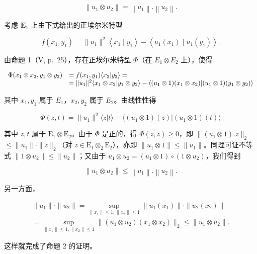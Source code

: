 \[
\left\| u _ {1} \otimes u _ {2} \right\| = \left\| u _ {1} \right\|. \left\| u _ {2} \right\|.
\]

考虑 \(\mathbf{E}_1\) 上由下式给出的正埃尔米特型

\[
f \left(x _ {1}, y _ {1}\right) = \| u _ {1} \| ^ {2} \left\langle x _ {1} \mid y _ {1} \right\rangle - \left\langle u _ {1} \left(x _ {1}\right) \mid u _ {1} \left(y _ {1}\right) \right\rangle .
\]

由命题 1（V, p.~25），存在正埃尔米特型 \(\Phi\)（在 \(E_1 \otimes E_2\) 上），使得

\[
\begin{array}{r l} \Phi (x _ {1} \otimes x _ {2}, y _ {1} \otimes y _ {2}) & = f (x _ {1}, y _ {1}) \langle x _ {2} | y _ {2} \rangle = \\ & = \| u _ {1} \| ^ {2} \langle x _ {1} \otimes x _ {2} | y _ {1} \otimes y _ {2} \rangle - \langle (u _ {1} \otimes 1) (x _ {1} \otimes x _ {2}) | (u _ {1} \otimes 1) (y _ {1} \otimes y _ {2}) \rangle \end{array}
\]

其中 \(x_{1}, y_{1}\) 属于 \(E_{1}\)，\(x_{2}, y_{2}\) 属于 \(E_{2}\)。由线性性得

\[
\Phi (z, t) = \| u _ {1} \| ^ {2} \langle z | t \rangle - \langle (u _ {1} \otimes 1) (z) | (u _ {1} \otimes 1) (t) \rangle
\]

其中 \(z, t\) 属于 \(\mathrm{E}_1 \otimes \mathrm{E}_2\)。由于 \(\Phi\) 是正的，得 \(\Phi(z, z) \geqslant 0\)，即 \(\| (u_1 \otimes 1).z \|_2\) \(\leqslant \| u_1\| \cdot \| z\| _2\)（对 \(z\in \mathrm{E}_1\otimes_2\mathrm{E}_2\)），亦即 \(\| u_1\otimes 1\| \leqslant \| u_1\|\)。同理可证不等式 \(\| 1\otimes u_2\| \leqslant \| u_2\|\)；又由于 \(u_{1}\otimes u_{2} = (u_{1}\otimes 1)\circ (1\otimes u_{2})\)，我们得到

\[
\left\| u _ {1} \otimes u _ {2} \right\| \leqslant \left\| u _ {1} \right\|. \left\| u _ {2} \right\|.
\]

另一方面，

\[
\begin{array}{l} \| u _ {1} \| \cdot \| u _ {2} \| = \sup _ {\| x _ {1} \| \leqslant 1, \| x _ {2} \| \leqslant 1} \| u _ {1} (x _ {1}) \| \cdot \| u _ {2} (x _ {2}) \| \\ = \sup _ {\| x _ {1} \| \leqslant 1, \| x _ {2} \| \leqslant 1} \| (u _ {1} \otimes u _ {2}) (x _ {1} \otimes x _ {2}) \| _ {2} \leqslant \| u _ {1} \otimes u _ {2} \|. \end{array}
\]

这样就完成了命题 2 的证明。


